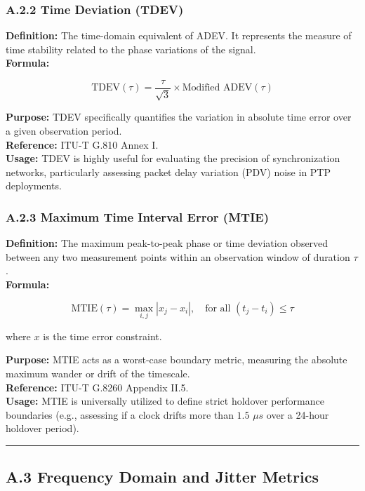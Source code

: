 \subsubsection{A.2.2 Time Deviation
(TDEV)}\label{a.2.2-time-deviation-tdev}

\textbf{Definition:} The time-domain equivalent of ADEV. It represents
the measure of time stability related to the phase variations of the
signal.\\
\textbf{Formula:}

\[ \text{TDEV}(\tau) = \frac{\tau}{\sqrt{3}} \times \text{Modified ADEV}(\tau) \]

\textbf{Purpose:} TDEV specifically quantifies the variation in absolute
time error over a given observation period.\\
\textbf{Reference:} ITU-T G.810 Annex I.\\
\textbf{Usage:} TDEV is highly useful for evaluating the precision of
synchronization networks, particularly assessing packet delay variation
(PDV) noise in PTP deployments.

\subsubsection{A.2.3 Maximum Time Interval Error
(MTIE)}\label{a.2.3-maximum-time-interval-error-mtie}

\textbf{Definition:} The maximum peak-to-peak phase or time deviation
observed between any two measurement points within an observation window
of duration \(\tau\).\\
\textbf{Formula:}

\[ \text{MTIE}(\tau) = \max_{i,j} |x_j - x_i|, \quad \text{for all } (t_j - t_i) \le \tau \]

where \(x\) is the time error constraint.

\textbf{Purpose:} MTIE acts as a worst-case boundary metric, measuring
the absolute maximum wander or drift of the timescale.\\
\textbf{Reference:} ITU-T G.8260 Appendix II.5.\\
\textbf{Usage:} MTIE is universally utilized to define strict holdover
performance boundaries (e.g., assessing if a clock drifts more than
\(1.5\) \(\mu s\) over a 24-hour holdover period).

\begin{center}\rule{0.5\linewidth}{0.5pt}\end{center}

\subsection{A.3 Frequency Domain and Jitter
Metrics}\label{a.3-frequency-domain-and-jitter-metrics}

